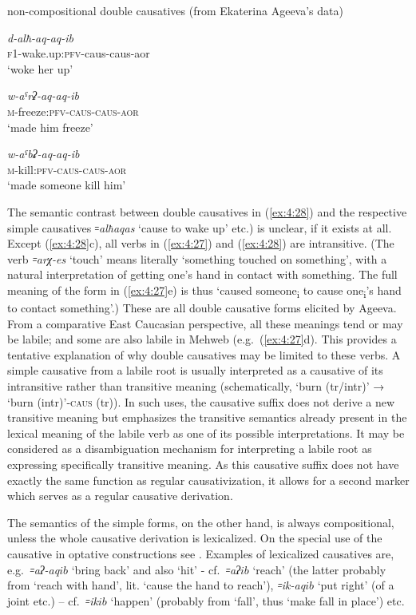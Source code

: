 \documentclass[output=paper]{langsci/langscibook}
\begin{document}
\ex \label{ex:4:28} %
non-compositional double causatives (from Ekaterina Ageeva's data)

\ea %
\gll \emph{d-alħ-aq-aq-ib}\\
\textsc{f1}-wake.up:\textsc{pfv}-caus-caus-aor\\
\glt `woke her up'


\ex %
\gll \emph{w-aˤrʡ-aq-aq-ib}\\
\textsc{m}-freeze:\textsc{pfv}-\textsc{caus}-\textsc{caus}-\textsc{aor}\\
\glt  `made him freeze'

\ex %
\gll \emph{w-aˤbʡ-aq-aq-ib}\\
\textsc{m}-kill:\textsc{pfv}-\textsc{caus}-\textsc{caus}-\textsc{aor}\\
\glt `made someone kill him'
\z
\z

The semantic contrast between double causatives in (\ref{ex:4:28}) and the respective
simple causatives ꞊\emph{alħaqas} `cause to wake up' etc.) is unclear, if it
exists at all. Except (\ref{ex:4:28}c), all verbs in (\ref{ex:4:27}) and (\ref{ex:4:28}) are
intransitive. (The verb \emph{꞊arχ-es} `touch' means literally
`something touched on something', with a natural interpretation of
getting one's hand in contact with something. The full meaning of the
form in (\ref{ex:4:27}e) is thus `caused someone\textsubscript{i} to cause
one\textsubscript{i}'s hand to contact something'.) These are all double
causative forms elicited by Ageeva. From a comparative East Caucasian
perspective, all these meanings tend or may be labile; and some are also
labile in Mehweb (e.g.\ (\ref{ex:4:27}d). This provides a tentative explanation of
why double causatives may be limited to these verbs. A simple causative
from a labile root is usually interpreted as a causative of its
intransitive rather than transitive meaning (schematically, `burn
(tr/intr)' → `burn (intr)'-\textsc{caus} (tr)). In such uses, the
causative suffix does not derive a new transitive meaning but emphasizes
the transitive semantics already present in the lexical meaning of the
labile verb as one of its possible interpretations. It may be considered
as a disambiguation mechanism for interpreting a labile root as
expressing specifically transitive meaning. As this causative suffix
does not have exactly the same function as regular causativization, it
allows for a second marker which serves as a regular causative
derivation.

The semantics of the simple  forms, on the other hand, is
always compositional, unless the whole causative derivation is
lexicalized. On the special use of the causative in optative
constructions see \citet{dobrushina2019}. Examples of lexicalized causatives
are, e.g.\ \emph{꞊aʔ-aq\(ib\)} `bring back' and also `hit' -
cf.\ \emph{꞊aʔ\(ib\)} `reach' (the latter probably from `reach with
hand', lit. `cause the hand to reach'), \emph{꞊ik-aq\(ib\)}
`put right' (of a joint etc.) – cf.\ \emph{꞊ik\(ib\)} `happen' (probably
from `fall', thus `make fall in place') etc.
\end{document}
